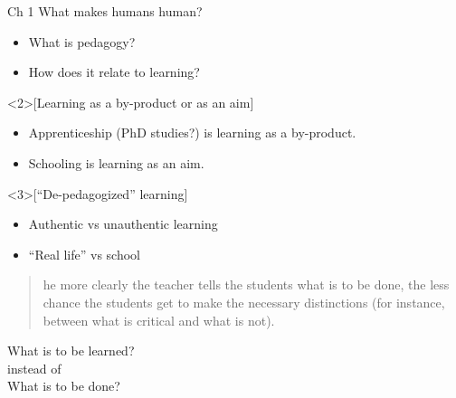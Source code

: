 \begin{frame}
  \begin{block}{Ch 1 What makes humans human?}
    \begin{itemize}
      \item What is pedagogy?
      \item How does it relate to learning?
    \end{itemize}
  \end{block}

  \begin{example}<2>[Learning as a by-product or as an aim]
    \begin{itemize}
      \item Apprenticeship (PhD studies?) is learning as a by-product.
      \item Schooling is learning as an aim.
    \end{itemize}
  \end{example}

  \begin{example}<3>[\enquote{De-pedagogized} learning]
    \begin{itemize}
      \item Authentic vs unauthentic learning
      \item \enquote{Real life} vs school
    \end{itemize}
  \end{example}
\end{frame}

\begin{frame}
  \begin{example}
    \blockcquote[p.~13]{NecessaryConditionsOfLearning}{%
      he more clearly the teacher tells the students what is to be 
      done, the less chance the students get to make the necessary distinctions 
      (for instance, between what is critical and what is not).%
    }
  \end{example}
\end{frame}

\begin{frame}
  \begin{center}
    What is to be learned?\\[1em]
    instead of\\[1em]
    What is to be done?
  \end{center}
\end{frame}

